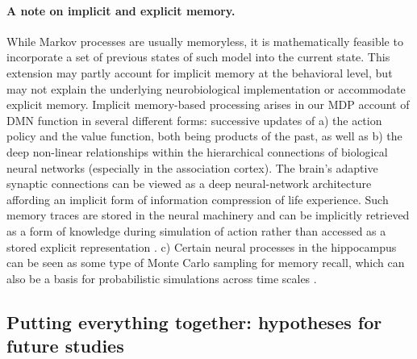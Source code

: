 \documentclass[10pt,letterpaper]{article}
\begin{document}
\paragraph*{A note on implicit and explicit memory.}
While Markov processes are usually memoryless, it is mathematically feasible to
incorporate a set of previous states of such model into the current state. This
extension may partly account for implicit memory at the behavioral level, but
may not explain the underlying neurobiological implementation or accommodate
explicit memory. Implicit memory-based processing arises in our MDP account of
DMN function in several different forms: successive updates of a) the action
policy and the value function, both being products of the past, as well as b)
the deep non-linear relationships within the hierarchical connections of
biological neural networks (especially in the association cortex).
The brain's adaptive synaptic connections can be
viewed as a deep neural-network architecture affording an implicit form of
information compression of life experience. Such memory traces are stored in the
neural machinery and can be implicitly retrieved as a form of knowledge during
simulation of action rather than accessed as a stored explicit representation
\citep{pezzulo2011grounding}. c) Certain neural processes in the hippocampus can
be seen as some type of Monte Carlo sampling for memory recall, which can also
be a basis for probabilistic simulations across time scales
\citep{schacter2007remembering,Axelrod2017}.


\subsection{Putting everything together: hypotheses for future studies}
\end{document}
